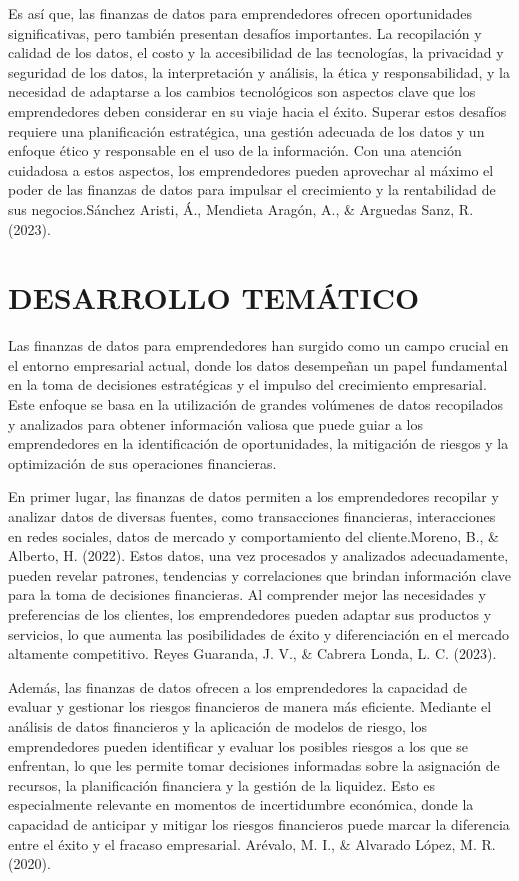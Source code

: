 \documentclass[
  letterpaper,
  DIV=11,
  numbers=noendperiod]{scrreprt}
\begin{document}
Es así que, las finanzas de datos para emprendedores ofrecen
oportunidades significativas, pero también presentan desafíos
importantes. La recopilación y calidad de los datos, el costo y la
accesibilidad de las tecnologías, la privacidad y seguridad de los
datos, la interpretación y análisis, la ética y responsabilidad, y la
necesidad de adaptarse a los cambios tecnológicos son aspectos clave que
los emprendedores deben considerar en su viaje hacia el éxito. Superar
estos desafíos requiere una planificación estratégica, una gestión
adecuada de los datos y un enfoque ético y responsable en el uso de la
información. Con una atención cuidadosa a estos aspectos, los
emprendedores pueden aprovechar al máximo el poder de las finanzas de
datos para impulsar el crecimiento y la rentabilidad de sus
negocios.Sánchez Aristi, Á., Mendieta Aragón, A., \& Arguedas Sanz, R.
(2023).

\hypertarget{desarrollo-temuxe1tico}{%
\section{DESARROLLO TEMÁTICO}\label{desarrollo-temuxe1tico}}

Las finanzas de datos para emprendedores han surgido como un campo
crucial en el entorno empresarial actual, donde los datos desempeñan un
papel fundamental en la toma de decisiones estratégicas y el impulso del
crecimiento empresarial. Este enfoque se basa en la utilización de
grandes volúmenes de datos recopilados y analizados para obtener
información valiosa que puede guiar a los emprendedores en la
identificación de oportunidades, la mitigación de riesgos y la
optimización de sus operaciones financieras.

En primer lugar, las finanzas de datos permiten a los emprendedores
recopilar y analizar datos de diversas fuentes, como transacciones
financieras, interacciones en redes sociales, datos de mercado y
comportamiento del cliente.Moreno, B., \& Alberto, H. (2022). Estos
datos, una vez procesados y analizados adecuadamente, pueden revelar
patrones, tendencias y correlaciones que brindan información clave para
la toma de decisiones financieras. Al comprender mejor las necesidades y
preferencias de los clientes, los emprendedores pueden adaptar sus
productos y servicios, lo que aumenta las posibilidades de éxito y
diferenciación en el mercado altamente competitivo. Reyes Guaranda, J.
V., \& Cabrera Londa, L. C. (2023).

Además, las finanzas de datos ofrecen a los emprendedores la capacidad
de evaluar y gestionar los riesgos financieros de manera más eficiente.
Mediante el análisis de datos financieros y la aplicación de modelos de
riesgo, los emprendedores pueden identificar y evaluar los posibles
riesgos a los que se enfrentan, lo que les permite tomar decisiones
informadas sobre la asignación de recursos, la planificación financiera
y la gestión de la liquidez. Esto es especialmente relevante en momentos
de incertidumbre económica, donde la capacidad de anticipar y mitigar
los riesgos financieros puede marcar la diferencia entre el éxito y el
fracaso empresarial. Arévalo, M. I., \& Alvarado López, M. R. (2020).
\end{document}
